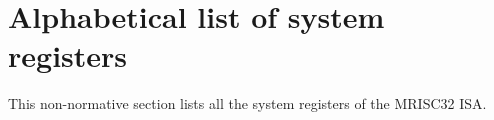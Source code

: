 %

\chapter{Alphabetical list of system registers}

This non-normative section lists all the system registers of the MRISC32 ISA.


